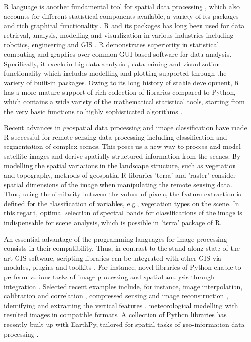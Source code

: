 \documentclass[ijgi,article,submit,pdftex,moreauthors]{Definitions/mdpi}
\begin{document}
R language is another fundamental tool for spatial data processing \cite{RCoreTeam}, which also accounts for different statistical components available, a variety of its packages and rich graphical functionality \cite{Murrell}. R and its packages has long been used for data retrieval, analysis, modelling and visualization in various industries including robotics, engineering and GIS \cite{7847824,Lemenkova2022a,9378399,Lemenkova202216,9390011}. R demonstrates superiority in statistical computing and graphics over common GUI-based software for data analysis. Specifically, it excels in big data analysis \cite{7570960,9752002,6597171}, data mining \cite{7978404} and visualization functionality \cite{Lemenkova201991} which includes modelling and plotting supported through the variety of built-in packages. Owing to its long history of stable development, R has a more mature support of rich collection of libraries compared to Python, which contains a wide variety of the mathematical statistical tools, starting from the very basic functions to highly sophisticated algorithms \cite{9675988}. 

Recent advances in geospatial data processing \cite{8226275} and image classification \cite{9844952,8117873} have made R successful for remote sensing data processing including classification and segmentation of complex scenes. This poses us a new way to process and model satellite images and derive spatially structured information from the scenes. By modelling the spatial variations in the landscape structure, such as vegetation and topography, methods of geospatial R libraries 'terra' and 'raster' consider spatial dimensions of the image when manipulating the remote sensing data. Thus, using the similarity between the values of pixels, the feature extraction is defined for the classification of variables, e.g., vegetation types on the scene. In this regard, optimal selection of spectral bands for classifications of the image is indispensable for scene analysis, which is possible in 'terra' package of R. 

An essential advantage of the programming languages for image processing consists in their compatibility. Thus, in contrast to the stand along state-of-the-art GIS software, scripting libraries can be integrated with other GIS via modules, plugins and toolkits \cite{6407912,7378577,VOS2019104528}. For instance, novel libraries of Python enable to perform various tasks of image processing and spatial analysis through integration \cite{1247428,Rey2010PySALAP,Rey2010}. Selected recent examples include, for instance, image interpolation, calibration and correlation \cite{DEDEUSFILHO2022101131}, compressed sensing and image reconstruction \cite{FARRENS2020100402}, identifying and extracting the vertical features \cite{GAO2022105503}, meteorological modelling \cite{6528254} with resulted images in compatible formats. A collection of Python libraries \cite{ROBERTS2022105192,CHEN2022105362} has recently built up with EarthPy, tailored for spatial tasks of geo-information data processing \cite{wasser2019EarthPyAP}.  
\end{document}
